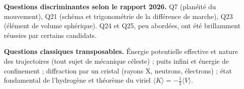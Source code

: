 \documentclass[11pt,a4paper]{article}
\begin{document}
\textbf{Questions discriminantes selon le rapport 2026.} Q7 (planéité du mouvement), Q21 (schéma et trigonométrie de la différence de marche), Q23 (élément de volume sphérique). Q24 et Q25, peu abordées, ont été brillamment réussies par certains candidats.

\textbf{Questions classiques transposables.} Énergie potentielle effective et nature des trajectoires (tout sujet de mécanique céleste) ; puits infini et énergie de confinement ; diffraction par un cristal (rayons X, neutrons, électrons) ; état fondamental de l'hydrogène et théorème du viriel \(\langle K\rangle=-\frac12\langle V\rangle\).
\end{document}
